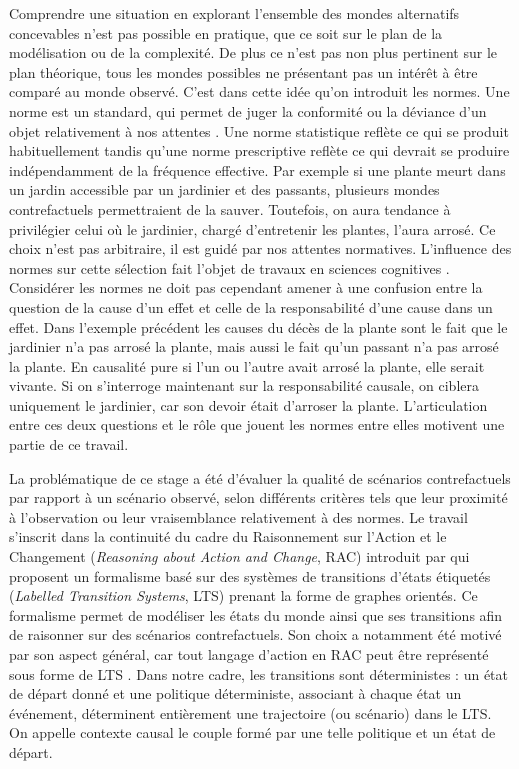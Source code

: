 Comprendre une situation en explorant l'ensemble des mondes alternatifs concevables n'est pas possible en pratique, que ce soit sur le plan de la modélisation ou de la complexité. De plus ce n'est pas non plus pertinent sur le plan théorique, tous les mondes possibles ne présentant pas un intérêt à être comparé au monde observé. C'est dans cette idée qu'on introduit les normes. Une norme est un standard, qui permet de juger la conformité ou la déviance d'un objet relativement à nos attentes \parencite{damico_interventionist_nodate}. Une norme statistique reflète ce qui se produit habituellement tandis qu'une norme prescriptive reflète ce qui devrait se produire indépendamment de la fréquence effective. Par exemple si une plante meurt dans un jardin accessible par un jardinier et des passants, plusieurs mondes contrefactuels permettraient de la sauver. Toutefois, on aura tendance à privilégier celui où le jardinier, chargé d'entretenir les plantes, l'aura arrosé. Ce choix n'est pas arbitraire, il est guidé par nos attentes normatives. L'influence des normes sur cette sélection fait l'objet de travaux en sciences cognitives \parencite{icard_normality_2017}. 
Considérer les normes ne doit pas cependant amener à une confusion entre la question de la cause d'un effet et celle de la responsabilité d'une cause dans un effet. Dans l'exemple précédent les causes du décès de la plante sont le fait que le jardinier n'a pas arrosé la plante, mais aussi le fait qu'un passant n'a pas arrosé la plante. En causalité pure si l'un ou l'autre avait arrosé la plante, elle serait vivante. Si on s'interroge maintenant sur la responsabilité causale, on ciblera uniquement le jardinier, car son devoir était d'arroser la plante. L'articulation entre ces deux questions et le rôle que jouent les normes entre elles motivent une partie de ce travail.

La problématique de ce stage a été d'évaluer la qualité de scénarios contrefactuels par rapport à un scénario observé, selon différents critères tels que leur proximité à l'observation ou leur vraisemblance relativement à des normes. Le travail s'inscrit dans la continuité du cadre du Raisonnement sur l'Action et le Changement (\textit{Reasoning about Action and Change}, RAC) introduit par \cite{sarmiento2023actionlanguagesbasedactual} qui proposent un formalisme basé sur des systèmes de transitions d'états étiquetés (\textit{Labelled Transition Systems}, LTS) prenant la forme de graphes orientés. Ce formalisme permet de modéliser les états du monde ainsi que ses transitions afin de raisonner sur des scénarios contrefactuels. Son choix a notamment été motivé par son aspect général, car tout langage d'action en RAC peut être représenté sous forme de LTS \parencite{sarmiento_formalising_2025}. Dans notre cadre, les transitions sont déterministes : un état de départ donné et une politique déterministe,  associant à chaque état un événement, déterminent entièrement une trajectoire (ou scénario) dans le LTS. On appelle contexte causal le couple formé par une telle politique et un état de départ.

